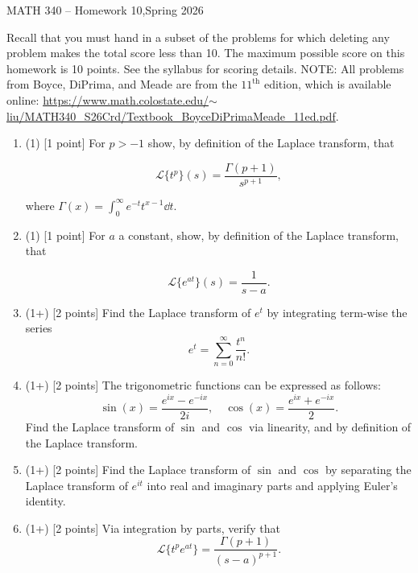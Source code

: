 \documentclass[12pt]{article}
\newcommand{\cL}{\mathcal{L}}
\begin{document}
\begin{center}
   {\Large MATH 340 -- Homework 10,\quad Spring 2026}
\end{center}

Recall that you must hand in a subset of the problems for which deleting any problem makes the total score less than 10. The maximum possible score on this homework is 10 points. See the syllabus for scoring details. NOTE: All problems from Boyce, DiPrima, and Meade are from the \(11^{\text{th}}\) edition, which is available online: \href{https://www.math.colostate.edu/~liu/MATH340_S26Crd/Textbook_BoyceDiPrimaMeade_11ed.pdf}{https://www.math.colostate.edu/\(\sim\)liu/MATH340\_S26Crd/Textbook\_BoyceDiPrimaMeade\_11ed.pdf}.

\begin{enumerate}

   \item (1) [1 point] For \(p>-1\) show, by definition of the Laplace transform, that

         \[
            \cL\lbrace t^p\rbrace(s)=\frac{\Gamma(p+1)}{s^{p+1}},
         \]

         where \(\Gamma(x)=\int_{0}^{\infty}e^{-t}t^{x-1}\dd t\).

   \item (1) [1 point] For \(a\) a constant, show, by definition of the Laplace transform, that

         \[
            \cL\lbrace e^{at}\rbrace(s)=\frac{1}{s-a}.
         \]

   \item (1+) [2 points] Find the Laplace transform of \(e^t\) by integrating term-wise the series
         \[
            e^{t}=\sum_{n=0}^{\infty}\frac{t^n}{n!}.
         \]

   \item (1+) [2 points] The trigonometric functions can be expressed as follows:
         \[
            \sin(x)=\frac{e^{ix}-e^{-ix}}{2i},\quad\cos(x)=\frac{e^{ix}+e^{-ix}}{2}.
         \]
         Find the Laplace transform of \(\sin\) and \(\cos\) via linearity, and by definition of the Laplace transform.

   \item (1+) [2 points] Find the Laplace transform of \(\sin\) and \(\cos\) by separating the Laplace transform of \(e^{it}\) into real and imaginary parts and applying Euler's identity.

   \item (1+) [2 points] Via integration by parts, verify that
         \[
            \cL\lbrace t^pe^{at}\rbrace=\frac{\Gamma(p+1)}{(s-a)^{p+1}}.
         \]


\end{enumerate}
\end{document}
